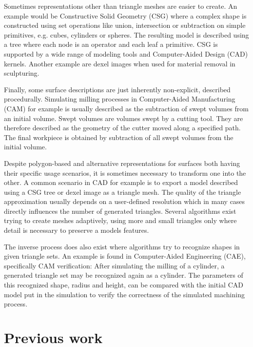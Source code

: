 Sometimes representations other than triangle meshes are easier to create.
An example would be Constructive Solid Geometry (CSG) where a complex shape is constructed using set operations like union, intersection or subtraction on simple primitives, e.g. cubes, cylinders or spheres.
The resulting model is described using a tree where each node is an operator and each leaf a primitive.
CSG is supported by a wide range of modeling tools and Computer-Aided Design (CAD) kernels.
Another example are dexel images when used for material removal in sculpturing.

Finally, some surface descriptions are just inherently non-explicit, \eg described procedurally.
Simulating milling processes in Computer-Aided Manufacturing (CAM) for example is usually described as the subtraction of swept volumes from an initial volume.
Swept volumes are volumes swept by a cutting tool.
They are therefore described as the geometry of the cutter moved along a specified path.
The final workpiece is obtained by subtraction of all swept volumes from the initial volume.


Despite polygon-based and alternative representations for surfaces both having their specific usage scenarios, it is sometimes necessary to transform one into the other.
A common scenario in CAD for example is to export a model described using a CSG tree or dexel image as a triangle mesh.
The quality of the triangle approximation usually depends on a user-defined resolution which in many cases directly influences the number of generated triangles.
Several algorithms exist trying to create meshes adaptively, using more and small triangles only where detail is necessary to preserve a models features.

The inverse process does also exist where algorithms try to recognize shapes in given triangle sets.
An example is found in Computer-Aided Engineering (CAE), specifically CAM verification: After simulating the milling of a cylinder, a generated triangle set may be recognized again as a cylinder. The parameters of this recognized shape, \eg radius and height, can be compared with the initial CAD model put in the simulation to verify the correctness of the simulated machining process.


\section{Previous work}

